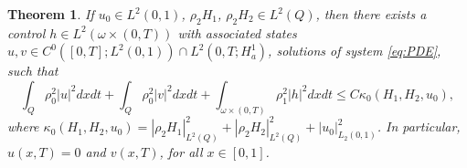 \documentclass[11pt,oneside,a4papper]{osajnl}
\newtheorem{teo}{Theorem}
\begin{document}
\begin{teo}\label{theorem case linear}
If $u_{0}\in L^{2}(0,1)$, $\rho_2 H_1$, $\rho_2 H_2 \in L^2(Q)$, then there exists a control $h\in L^{2}(\omega \times (0,T))$ with associated states $u,v \in C^{0}([0,T];L^{2}(0,1))\cap L^{2}(0,T;H^{1}_{a})$, solutions of system \eqref{eq:PDE}, such that
\begin{equation}\label{estimate for solution}
\int_Q \rho_0^2 |u|^2 dxdt + \int_Q \rho_0^2 |v|^2 dxdt + \int_{\omega \times (0,T)} \rho_1^2 |h|^2dxdt \leq
C \kappa_{0}(H_{1},H_{2},u_{0}),   
\end{equation}
where $\kappa_{0}(H_{1},H_{2},u_{0})= |\rho_2 H_1|^2_{L^2(Q)} + |\rho_2 H_2|^2_{L^2(Q)} + |u_0|^2_{L_2(0,1)}$. In particular, $u(x,T)=0$ and $v(x,T)$, for all $x\in [0,1]$. 

\end{teo}
\end{document}
